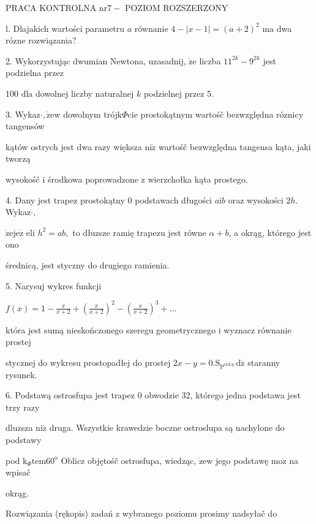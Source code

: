 \documentclass[a4paper,12pt]{article}
\begin{document}
PRACA KONTROLNA $\mathrm{n}\mathrm{r} 7-$ POZIOM ROZSZERZONY

l. Dlajakich wartości parametru $a$ równanie $4-|x-1|=(a+2)^{2}$ ma dwa rózne rozwiązania?

2. Wykorzystując dwumian Newtona, uzasadnij, $\dot{\mathrm{z}}\mathrm{e}$ liczba $11^{2k}-9^{2k}$ jest podzielna przez

100 dla dowolnej liczby naturalnej $k$ podzielnej przez 5.

3. Wykaz$\cdot, \dot{\mathrm{z}}\mathrm{e}\mathrm{w}$ dowolnym trójk$\Phi$cie prostokątnym wartośč bezwzględna róznicy tangensów

kątów ostrych jest dwa razy większa $\mathrm{n}\mathrm{i}\dot{\mathrm{z}}$ wartośč bezwzględna tangensa kąta, jaki tworzą

wysokośč $\mathrm{i}$ środkowa poprowadzone $\mathrm{z}$ wierzchołka kąta prostego.

4. Dany jest trapez prostokątny $0$ podstawach długości $a\mathrm{i}b$ oraz wysokości $2h$. Wykaz$\cdot,$

$\dot{\mathrm{z}}\mathrm{e}\mathrm{j}\mathrm{e}\dot{\mathrm{z}}$ eli $h^{2}=ab,$ to dłuzsze ramię trapezu jest równe $\alpha+b$, a okrąg, którego jest ono

średnicą, jest styczny do drugiego ramienia.

5. Narysuj wykres funkcji

$ f(x)=1-\displaystyle \frac{x}{x+2}+(\frac{x}{x+2})^{2}-(\frac{x}{x+2})^{3}+\ldots$

która jest sumą nieskończonego szeregu geometrycznego $\mathrm{i}$ wyznacz równanie prostej

stycznej do wykresu prostopadłej do prostej $2x-y=0. \mathrm{S}_{\mathrm{P}^{\mathrm{o}\mathrm{r}\mathrm{Z}\otimes}}\mathrm{d}\acute{\mathrm{z}}$ staranny rysunek.

6. Podstawą ostrosfupa jest trapez $0$ obwodzie 32, którego jedna podstawa jest trzy razy

dluzsza $\mathrm{n}\mathrm{i}\dot{\mathrm{z}}$ druga. Wszystkie krawedzie boczne ostroslupa są nachylone do podstawy

pod $\mathrm{k}_{\Phi}\mathrm{t}\mathrm{e}\mathrm{m}60^{\mathrm{o}}$ Oblicz objętośč ostrosfupa, wiedząc, $\dot{\mathrm{z}}\mathrm{e}\mathrm{w}$ jego podstawę $\mathrm{m}\mathrm{o}\dot{\mathrm{z}}$ na wpisač

okrąg.

Rozwiązania (rękopis) zadań z wybranego poziomu prosimy nadsyłač do
\end{document}
